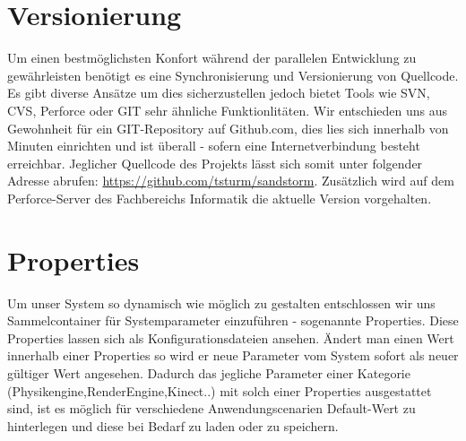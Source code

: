 \begin{Spacing}{\mylinespace}
\section{Versionierung}
Um einen bestmöglichsten Konfort während der parallelen Entwicklung zu gewährleisten benötigt es eine Synchronisierung und Versionierung von Quellcode. Es gibt diverse Ansätze um dies sicherzustellen jedoch bietet Tools wie SVN, CVS, Perforce oder GIT sehr ähnliche Funktionlitäten. Wir entschieden uns aus Gewohnheit für ein GIT-Repository auf Github.com, dies lies sich innerhalb von Minuten einrichten und ist überall - sofern eine Internetverbindung besteht erreichbar. Jeglicher Quellcode des Projekts lässt sich somit unter folgender Adresse abrufen: \url{https://github.com/tsturm/sandstorm}. Zusätzlich wird auf dem Perforce-Server des Fachbereichs Informatik die aktuelle Version vorgehalten.


\section{Properties}
Um unser System so dynamisch wie möglich zu gestalten entschlossen wir uns Sammelcontainer für Systemparameter einzuführen - sogenannte Properties.
Diese Properties lassen sich als Konfigurationsdateien ansehen. Ändert man einen Wert innerhalb einer Properties so wird er neue Parameter vom System sofort als neuer gültiger Wert angesehen.
Dadurch das jegliche Parameter einer Kategorie (Physikengine,RenderEngine,Kinect..) mit solch einer Properties ausgestattet sind, ist es möglich für verschiedene Anwendungscenarien Default-Wert zu hinterlegen und diese bei Bedarf zu laden oder zu speichern.

\end{Spacing}
\newpage
\clearpage

